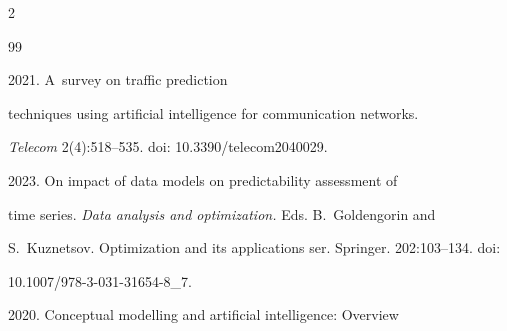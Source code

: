 








%







  










  \begin{multicols}{2}





\renewcommand{\bibname}{\protect\rmfamily References}







{\small\frenchspacing


 {%




 \begin{thebibliography}{99} 




 2021. A~survey on traffic prediction 


techniques using artificial intelligence for communication networks. 


\textit{Telecom} 2(4):518--535. doi: 10.3390/telecom2040029.




 2023. On impact of data models on predictability assessment of 


time series. \textit{Data analysis and optimization.} Eds. B.~Goldengorin and 


S.~Kuznetsov.  Optimization and its applications ser. Springer. 202:103--134. doi: 


10.1007/978-3-031-31654-8\_7.




 2020. Conceptual modelling and artificial intelligence: Overview 



\end{thebibliography}}}
\end{multicols}
